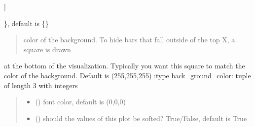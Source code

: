 \documentclass[letterpaper,10pt,english]{sphinxmanual}
\begin{document}
\begin{fulllineitems}
\begin{description}
\begin{description}
\begin{description}
\end{description}

\sphinxAtStartPar
{]}

\end{description}

\sphinxAtStartPar
\}, default is \{\}

\end{description}
\begin{quote}\begin{description}
\sphinxAtStartPar
{} \textendash{} color of the background. To hide bars that fall outside of the top X, a square is drawn

\end{description}\end{quote}

\sphinxAtStartPar
at the bottom of the visualization. Typically you want this square to match the color of the background. Default is (255,255,255)
:type back\_ground\_color: tuple of length 3 with integers
\begin{quote}\begin{description}
\begin{itemize}
\item {} 
\sphinxAtStartPar
{} () \textendash{} font color, default is (0,0,0)

\item {} 
\sphinxAtStartPar
{} () \textendash{} should the values of this plot be softed? True/False, default is True

\end{itemize}

\end{description}\end{quote}

\begin{fulllineitems}
\label{\detokenize{index:sjvisualizer.PieRace.pie_plot.draw}}
\pysigstartsignatures
{}
\pysigstopsignatures
\end{fulllineitems}


\begin{fulllineitems}
\label{\detokenize{index:sjvisualizer.PieRace.pie_plot.update}}
\pysigstartsignatures
{}
\pysigstopsignatures
\end{fulllineitems}


\end{fulllineitems}
\end{document}
